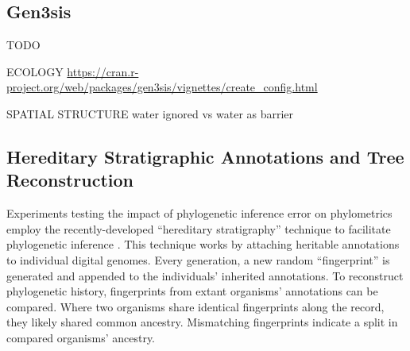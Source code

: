 









\subsection{Gen3sis}

TODO \citep{hagen2021gen3sis}

ECOLOGY \url{https://cran.r-project.org/web/packages/gen3sis/vignettes/create_config.html}

SPATIAL STRUCTURE
water ignored vs water as barrier


\subsection{Hereditary Stratigraphic Annotations and Tree Reconstruction}

Experiments testing the impact of phylogenetic inference error on phylometrics employ the recently-developed ``hereditary stratigraphy'' technique to facilitate phylogenetic inference \citep{moreno2022hstrat}.
This technique works by attaching heritable annotations to individual digital genomes.
Every generation, a new random ``fingerprint'' is generated and appended to the individuals' inherited annotations.
To reconstruct phylogenetic history, fingerprints from extant organisms' annotations can be compared.
Where two organisms share identical fingerprints along the record, they likely shared common ancestry.
Mismatching fingerprints indicate a split in compared organisms' ancestry.

